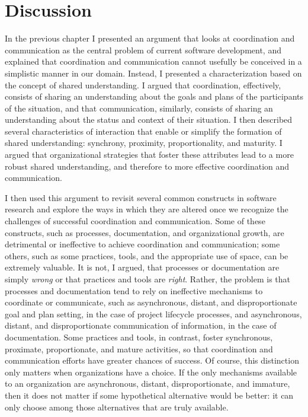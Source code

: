 \chapter{Discussion}

In the previous chapter I presented an argument that looks at coordination and communication as the central problem of current software development, and explained that coordination and communication cannot usefully be conceived in a simplistic manner in our domain. Instead, I presented a characterization based on the concept of shared understanding. I argued that coordination, effectively, consists of sharing an understanding about the goals and plans of the participants of the situation, and that communication, similarly, consists of sharing an understanding about the status and context of their situation. I then described several characteristics of interaction that enable or simplify the formation of shared understanding: synchrony, proximity, proportionality, and maturity. I argued that organizational strategies that foster these attributes lead to a more robust shared understanding, and therefore to more effective coordination and communication.

I then used this argument to revisit several common constructs in software research and explore the ways in which they are altered once we recognize the challenges of successful coordination and communication. Some of these constructs, such as processes, documentation, and organizational growth, are detrimental or ineffective to achieve coordination and communication; some others, such as some practices, tools, and the appropriate use of space, can be extremely valuable. It is not, I argued, that processes or documentation are simply \emph{wrong} or that practices and tools are \emph{right}. Rather, the problem is that processes and documentation tend to rely on ineffective mechanisms to coordinate or communicate, such as asynchronous, distant, and disproportionate goal and plan setting, in the case of project lifecycle processes, and asynchronous, distant, and disproportionate communication of information, in the case of documentation. Some practices and tools, in contrast, foster synchronous, proximate, proportionate, and mature activities, so that coordination and communication efforts have greater chances of success. Of course, this distinction only matters when organizations have a choice. If the only mechanisms available to an organization are asynchronous, distant, disproportionate, and immature, then it does not matter if some hypothetical alternative would be better: it can only choose among those alternatives that are truly available. 

